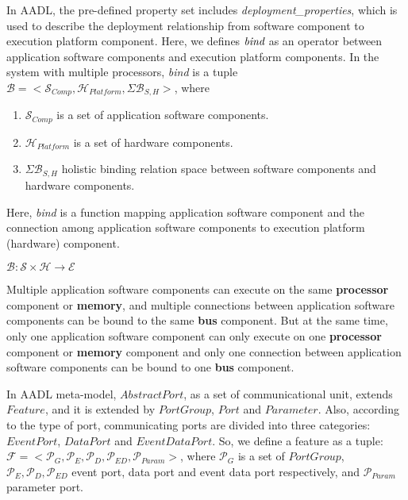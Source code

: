 In AADL, the pre-defined property set includes \emph{deployment\_properties}, which is used to describe the deployment relationship from software component to execution platform component. Here, we defines $\emph{bind}$ as an operator between application software components and execution platform components. In the system with multiple processors, \emph{bind} is a tuple $\mathcal{B} = <\mathcal{S}_{Comp}, \mathcal{H}_{Platform}, \Sigma\mathcal{B}_{S,H}>$, where
\begin{enumerate}
\item $\mathcal{S}_{Comp}$ is a set of application software components.
\item $\mathcal{H}_{Platform}$ is a set of hardware components.
\item $\Sigma\mathcal{B}_{S,H}$ holistic binding relation space between software components and hardware components.
\end{enumerate}

Here, \emph{bind} is a function mapping application software component and the connection among application software components to execution platform (hardware) component. 
\begin{center}
$\mathcal{B}: \mathcal{S}\times\mathcal{H}\rightarrow \mathcal{E}$
\end{center}

Multiple application software components can execute on the same \textbf{processor} component or \textbf{memory}, and multiple connections between application software components can be bound to the same \textbf{bus} component. 
But at the same time, only one application software component can only execute on one \textbf{processor} component or \textbf{memory} component and only one connection between application software components can be bound to one \textbf{bus} component. 

 In AADL meta-model, $AbstractPort$, as a set of communicational unit, extends $Feature$, and it is extended by $PortGroup$, $Port$ and $Parameter$. Also, according to the type of port, communicating ports are divided into three categories:  $EventPort$, $DataPort$ and $EventDataPort$. So, we define a feature as a tuple: $\mathcal{F} = <\mathcal{P}_{G}, \mathcal{P}_{E}, \mathcal{P}_{D}, \mathcal{P}_{ED}, \mathcal{P}_{Param}>$, where $\mathcal{P}_{G}$ is a set of $PortGroup$,  $\mathcal{P}_{E}, \mathcal{P}_{D}, \mathcal{P}_{ED}$ event port, data port and event data port respectively, and $\mathcal{P}_{Param}$ parameter port.




